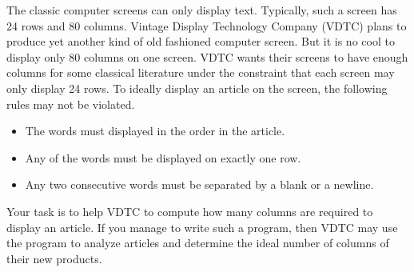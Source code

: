 The classic computer screens can only display text.
Typically, such a screen has 24 rows and 80 columns.
Vintage Display Technology Company (VDTC) plans to produce yet another
kind of old fashioned computer screen. 
But it is no cool to display only 80 columns on one screen.
VDTC wants their screens to have enough columns for some classical literature
under the constraint that each screen may only display 24 rows.
To ideally display an article on the screen, the following rules may not be
violated.
\begin{itemize}
\tightlist
\item The words must displayed in the order in the article.
\item Any of the words must be displayed on exactly one row. 
\item Any two consecutive words must be separated by a blank or a newline. 
\end{itemize}

Your task is to help VDTC to compute how many columns are required to display
an article. If you manage to write such a program, then VDTC may use the 
program to analyze articles and determine the ideal number of columns of 
their new products.
